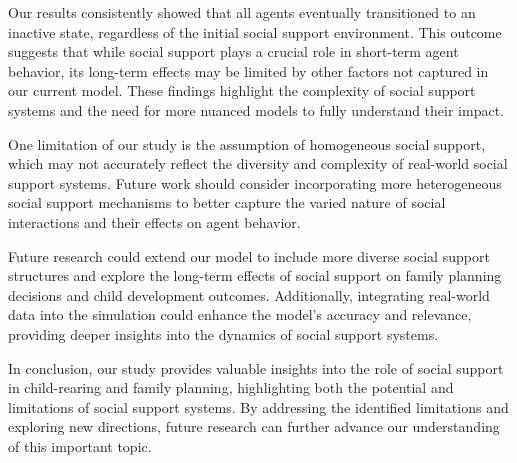 \documentclass{article} %
\begin{document}
Our results consistently showed that all agents eventually transitioned to an inactive state, regardless of the initial social support environment. This outcome suggests that while social support plays a crucial role in short-term agent behavior, its long-term effects may be limited by other factors not captured in our current model. These findings highlight the complexity of social support systems and the need for more nuanced models to fully understand their impact.

One limitation of our study is the assumption of homogeneous social support, which may not accurately reflect the diversity and complexity of real-world social support systems. Future work should consider incorporating more heterogeneous social support mechanisms to better capture the varied nature of social interactions and their effects on agent behavior.

Future research could extend our model to include more diverse social support structures and explore the long-term effects of social support on family planning decisions and child development outcomes. Additionally, integrating real-world data into the simulation could enhance the model's accuracy and relevance, providing deeper insights into the dynamics of social support systems.

In conclusion, our study provides valuable insights into the role of social support in child-rearing and family planning, highlighting both the potential and limitations of social support systems. By addressing the identified limitations and exploring new directions, future research can further advance our understanding of this important topic.



\end{document}
